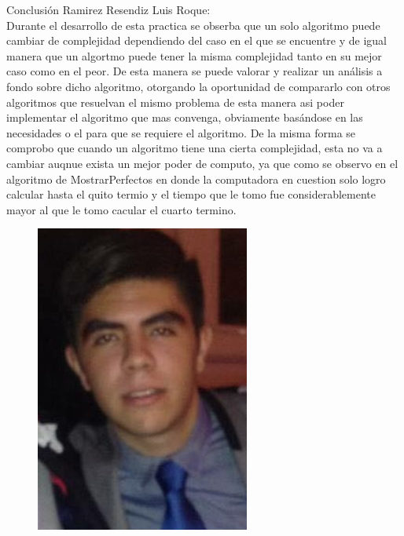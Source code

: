 \documentclass[12pt,twoside]{article}
\begin{document}
Conclusión Ramirez Resendiz Luis Roque:\\
Durante el desarrollo de esta practica se obserba que un solo algoritmo puede cambiar de complejidad dependiendo del caso en el que se encuentre y de igual manera que un algortmo puede tener la misma complejidad tanto en su mejor caso como en el peor. De esta manera se puede valorar y realizar un análisis a fondo sobre dicho algoritmo, otorgando la oportunidad de compararlo con otros algoritmos que resuelvan el mismo problema de esta manera asi poder implementar el algoritmo que mas convenga, obviamente basándose en las necesidades o el para que se requiere el algoritmo. De la misma forma se comprobo que cuando un algoritmo tiene una cierta complejidad, esta no va a cambiar auqnue exista un mejor poder de computo, ya que como se observo en el algoritmo de MostrarPerfectos en donde la computadora en cuestion solo logro calcular hasta el quito termio y el tiempo que le tomo fue considerablemente mayor al que le tomo cacular el cuarto termino. 
\begin{figure}[h!]
\centering
\includegraphics[scale=0.5]{luis1.jpg}

\label{fig:universe}
\end{figure}
\newpage
\end{document}
